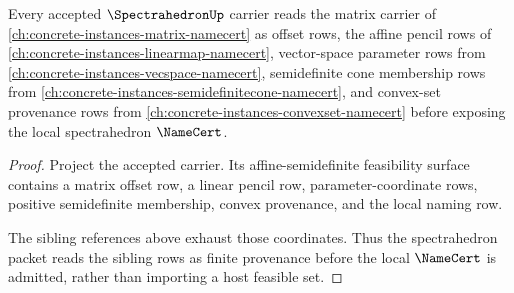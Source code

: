 \begin{theorem}
\label{thm:spectrahedron-sibling-dependency-route}
Every accepted $\SpectrahedronUp$ carrier reads the matrix carrier of \autoref{ch:concrete-instances-matrix-namecert} as offset rows, the affine pencil rows of \autoref{ch:concrete-instances-linearmap-namecert}, vector-space parameter rows from \autoref{ch:concrete-instances-vecspace-namecert}, semidefinite cone membership rows from \autoref{ch:concrete-instances-semidefinitecone-namecert}, and convex-set provenance rows from \autoref{ch:concrete-instances-convexset-namecert} before exposing the local spectrahedron $\NameCert$.
\end{theorem}
\begin{proof}
Project the accepted carrier. Its affine-semidefinite feasibility surface contains a matrix offset row, a linear pencil row, parameter-coordinate rows, positive semidefinite membership, convex provenance, and the local naming row.

The sibling references above exhaust those coordinates. Thus the spectrahedron packet reads the sibling rows as finite provenance before the local $\NameCert$ is admitted, rather than importing a host feasible set.
\end{proof}
